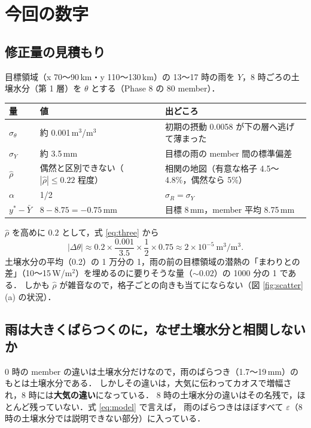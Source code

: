 \documentclass[dvipdfmx,a4paper,10.5pt]{jarticle}
\numberwithin{equation}{section}
\begin{document}
\section{今回の数字}\label{sec:ours}

\subsection{修正量の見積もり}
目標領域（x 70〜90\,km・y 110〜130\,km）の 13〜17 時の雨を $Y$，8 時ごろの土壌水分（第 1 層）を $\theta$ とする（Phase 8 の 80 member）．
\begin{center}
\begin{tabular}{lll}\toprule
量 & 値 & 出どころ \\ \midrule
$\sigma_\theta$ & 約 0.001\,m$^3$/m$^3$ & 初期の摂動 0.0058 が下の層へ逃げて薄まった \\
$\sigma_Y$ & 約 3.5\,mm & 目標の雨の member 間の標準偏差 \\
$\hat\rho$ & 偶然と区別できない（$|\hat\rho|\le 0.22$ 程度） & 相関の地図（有意な格子 4.5〜4.8\%，偶然なら 5\%） \\
$\alpha$ & 1/2 & $\sigma_R=\sigma_Y$ \\
$y^*-\bar Y$ & $8-8.75=-0.75$\,mm & 目標 8\,mm，member 平均 8.75\,mm \\ \bottomrule
\end{tabular}
\end{center}
$\hat\rho$ を高めに $0.2$ として，式 \eqref{eq:three} から
\begin{equation}
  |\Delta\theta| \approx 0.2\times\frac{0.001}{3.5}\times\frac12\times0.75 \approx 2\times10^{-5}\ \text{m}^3/\text{m}^3 .
\end{equation}
土壌水分の平均（0.2）の 1 万分の 1，雨の前の目標領域の潜熱の「まわりとの差」（10〜15\,W/m$^2$）を埋めるのに要りそうな量（$\sim0.02$）の 1000 分の 1 である．
しかも $\hat\rho$ が雑音なので，格子ごとの向きも当てにならない（図 \ref{fig:scatter}(a) の状況）．

\subsection{雨は大きくばらつくのに，なぜ土壌水分と相関しないか}
0 時の member の違いは土壌水分だけなので，雨のばらつき（1.7〜19\,mm）のもとは土壌水分である．
しかしその違いは，大気に伝わってカオスで増幅され，8 時には\textbf{大気の違い}になっている．
8 時の土壌水分の違いはその名残で，ほとんど残っていない．式 \eqref{eq:model} で言えば，
雨のばらつきはほぼすべて $\varepsilon$（8 時の土壌水分では説明できない部分）に入っている．
\end{document}
